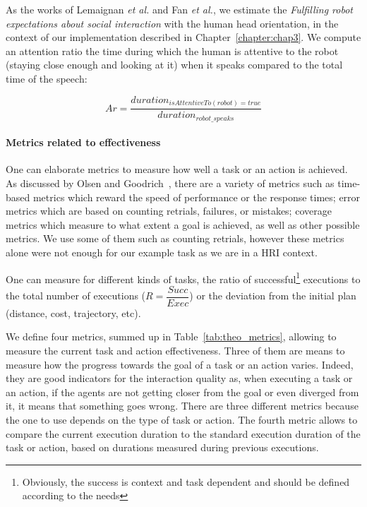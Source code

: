\documentclass[a4paper,11pt,twoside]{StyleThese}
\begin{document}
As the works of Lemaignan \textit{et al.} and Fan \textit{et al.}, we estimate the \textit{Fulfilling robot expectations about social interaction} with the human head orientation, in the context of our implementation described in Chapter~\ref{chapter:chap3}. We compute an attention ratio \ie the time during which the human is attentive to the robot (\ie staying close enough and looking at it) when it speaks compared to the total time of the speech:

\begin{equation}\label{eq:attention_r}
Ar = \frac{duration_{isAttentiveTo(robot)=true}}{duration_{robot\_speaks}}
\end{equation}

\paragraph{Metrics related to effectiveness}\label{subsec:task_eff}
One can elaborate metrics to measure how well a task or an action is achieved. As discussed by Olsen and Goodrich~\cite{olsen_2003_metrics}, there are a variety of metrics such as time-based metrics which reward the speed of performance or the response times; error metrics which are based on counting retrials, failures, or mistakes; coverage metrics which measure to what extent a goal is achieved, as well as other possible metrics. We use some of them such as counting retrials, however these metrics alone were not enough for our example task as we are in a HRI context.

One can measure for different kinds of tasks, the ratio of successful\footnote{Obviously, the success is context and task dependent and should be defined according to the needs} executions to the total number of executions (\eg $R=\dfrac{Succ}{Exec}$) or the deviation from the initial plan (distance, cost, trajectory, etc). 

We define four metrics, summed up in Table~\ref{tab:theo_metrics}, allowing to measure the current task and action effectiveness. Three of them are means to measure how the progress towards the goal of a task or an action varies. Indeed, they are good indicators for the interaction quality as, when executing a task or an action, if the agents are not getting closer from the goal or even diverged from it, it means that something goes wrong. There are three different metrics because the one to use depends on the type of task or action. The fourth metric allows to compare the current execution duration to the standard execution duration of the task or action, based on durations measured during previous executions.
\end{document}
